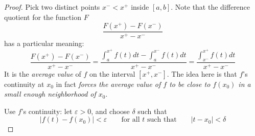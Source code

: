\documentclass{article}
\begin{document}
\begin{proof}
    Pick two distinct points $x^- < x^+$ inside $[a, b]$. 
    Note that the difference quotient for the function $F$
    \[
        \frac{F(x^+) - F(x^-)}{x^+-x^-}
    \]
    has a particular meaning:
    \[
        \frac{F(x^+) - F(x^-)}{x^+-x^-} = \frac{\displaystyle \int_a^{x^+} f(t)dt - \int_a^{x^-}f(t)dt}{x^+-x^-} = \frac{\displaystyle\int_{x^-}^{x^+} f(t)dt}{x^+-x^-}
    \]
    It is the \emph{average value} of $f$ on the interval $[x^+, x^-]$. The idea here is that $f$'s continuity at $x_0$ in fact \emph{forces the average value of $f$ to be close to $f(x_0)$ in a small enough neighborhood of $x_0$}. 

    Use $f$'s continuity: let $\varepsilon > 0$, and choose $\delta$ such that
    \[|f(t)-f(x_0)| < \varepsilon \qquad \text{for all }t\text{ such that} \qquad |t-x_0| < \delta\]


\end{proof}
\end{document}
